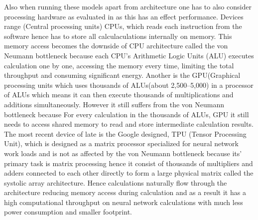 \documentclass[10pt,phd,a4paper,oneside]{article}
\begin{document}
    Also when running these models apart from architecture one has to also consider processing hardware as evaluated in \citep{wang2019benchmarking} as this has an effect performance. Devices range (Central processing units) CPUs, which reads each instruction from the software hence has to store all calculaculations internally on memory. This memory access becomes the downside of CPU architecture called the von Neumann bottleneck because each CPU's Arithmetic Logic Units (ALU) executes calculation one by one, accessing the memory every time, limiting the total throughput and consuming significant energy. Another is the GPU(Graphical processing units which uses thousands of ALUs(about 2,500–5,000) in a processor of ALUs which means it can then execute thousands of multiplications and additions simultaneously. However it still suffers from the von Neumann bottleneck because For every  calculation in the thousands of ALUs, GPU it still needs to access shared memory to read and store intermediate calculation results. The most recent device of late is the Google designed, TPU (Tensor Processing Unit), which is designed as a matrix processor specialized for neural network work loads and is not as affected by the von Neumann bottleneck because its' primary task is matrix processing hence it consist of thousands of multipliers and adders connected to each other directly to form a large physical matrix called the systolic array architecture. Hence calculations naturally flow through the architecture reducing memory access during calculation and as a result it has a high computational throughput on neural network calculations with much less power consumption and smaller footprint.



\end{document}
